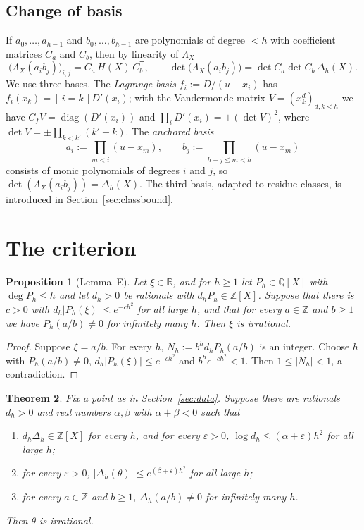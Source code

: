 \documentclass[11pt]{amsart}
\newtheorem{theorem}{Theorem}[section]
\newtheorem{proposition}[theorem]{Proposition}
\theoremstyle{definition}
\theoremstyle{remark}
\numberwithin{equation}{section}
\newcommand{\ZZ}{\mathbb{Z}}
\newcommand{\QQ}{\mathbb{Q}}
\newcommand{\RR}{\mathbb{R}}
\newcommand{\eps}{\varepsilon}
\newcommand{\ind}[1]{[\,#1\,]}
\begin{document}
\subsection{Change of basis}
If $a_0,\dots,a_{h-1}$ and $b_0,\dots,b_{h-1}$ are polynomials of degree $<h$ with coefficient matrices $C_a$ and $C_b$,
then by linearity of $\Lambda_X$
\begin{equation}\label{eq:gram}
  \bigl(\Lambda_X(a_ib_j)\bigr)_{i,j}=C_a\,H(X)\,C_b^{\mathsf T},\qquad
  \det\bigl(\Lambda_X(a_ib_j)\bigr)=\det C_a\det C_b\,\Delta_h(X).
\end{equation}
We use three bases. The \emph{Lagrange basis} $f_i:=D/(u-x_i)$ has $f_i(x_k)=\ind{i=k}D'(x_i)$; with the Vandermonde
matrix $V=(x_k^d)_{d,k<h}$ we have $C_fV=\operatorname{diag}(D'(x_i))$ and $\prod_iD'(x_i)=\pm(\det V)^2$, where
$\det V=\pm\prod_{k<k'}(k'-k)$. The \emph{anchored basis}
\[
  a_i:=\prod_{m<i}(u-x_m),\qquad b_j:=\prod_{h-j\le m<h}(u-x_m)
\]
consists of monic polynomials of degrees $i$ and $j$, so $\det(\Lambda_X(a_ib_j))=\Delta_h(X)$. The third basis, adapted
to residue classes, is introduced in Section~\ref{sec:classbound}.

\section{The criterion}\label{sec:criterion}

\begin{proposition}[Lemma~E]\label{prop:criterion}
Let $\xi\in\RR$, and for $h\ge1$ let $P_h\in\QQ[X]$ with $\deg P_h\le h$ and let $d_h>0$ be rationals with
$d_hP_h\in\ZZ[X]$. Suppose that there is $c>0$ with $d_h|P_h(\xi)|\le e^{-ch^2}$ for all large $h$, and that for
every $a\in\ZZ$ and $b\ge1$ we have $P_h(a/b)\ne0$ for infinitely many $h$. Then $\xi$ is irrational.
\end{proposition}

\begin{proof}
Suppose $\xi=a/b$. For every $h$, $N_h:=b^hd_hP_h(a/b)$ is an integer. Choose $h$ with $P_h(a/b)\ne0$,
$d_h|P_h(\xi)|\le e^{-ch^2}$ and $b^he^{-ch^2}<1$. Then $1\le|N_h|<1$, a contradiction.
\end{proof}

\begin{theorem}\label{thm:conditional}
Fix a point as in Section~\ref{sec:data}. Suppose there are rationals $d_h>0$ and real numbers $\alpha,\beta$ with
$\alpha+\beta<0$ such that
\begin{enumerate}
\item $d_h\Delta_h\in\ZZ[X]$ for every $h$, and for every $\eps>0$, $\log d_h\le(\alpha+\eps)h^2$ for all large $h$;
\item for every $\eps>0$, $|\Delta_h(\theta)|\le e^{(\beta+\eps)h^2}$ for all large $h$;
\item for every $a\in\ZZ$ and $b\ge1$, $\Delta_h(a/b)\ne0$ for infinitely many $h$.
\end{enumerate}
Then $\theta$ is irrational.
\end{theorem}
\end{document}
